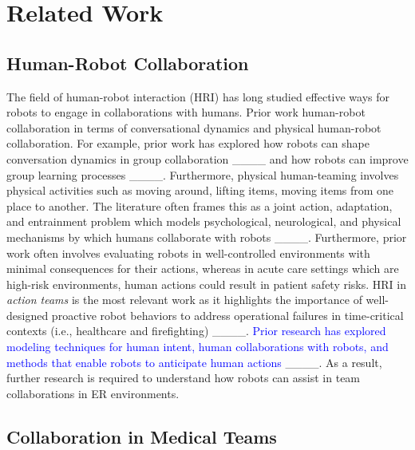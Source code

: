\section{Related Work}
\subsection{Human-Robot Collaboration} 

The field of human-robot interaction (HRI) has long studied effective ways for robots to engage in collaborations with humans. 
Prior work human-robot collaboration in terms of conversational dynamics and physical human-robot collaboration.%
For example, prior work has explored how robots can shape conversation dynamics in group collaboration ____ and how robots can improve group learning processes ____. 
Furthermore, physical human-teaming involves physical activities such as moving around, lifting items, moving items from one place to another. 
The literature often frames this as a joint action, adaptation, and entrainment problem which models psychological, neurological, and physical mechanisms by which humans collaborate with robots ____. 
Furthermore, prior work often involves evaluating robots in well-controlled environments with minimal consequences for their actions, whereas in acute care settings which are high-risk environments, human actions could result in patient safety risks. 
HRI in \textit{action teams} is the most relevant work as it highlights the importance of well-designed proactive robot behaviors to address operational failures in time-critical contexts (i.e., healthcare and firefighting) ____. 
\textcolor{blue}{Prior research has explored modeling techniques for human intent, human collaborations with robots, and methods that enable robots to anticipate human actions} ____.
As a result, further research is required to understand how robots can assist in team collaborations in ER environments.


\subsection{Collaboration in Medical Teams}

